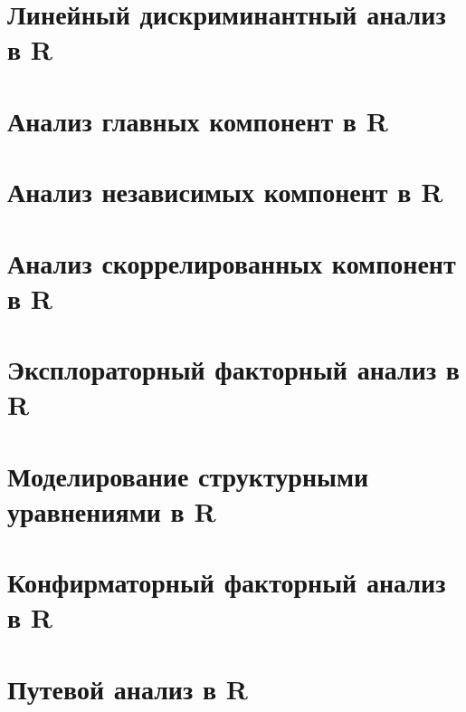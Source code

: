 \documentclass[
  letterpaper,
  DIV=11,
  numbers=noendperiod]{scrreprt}
\theoremstyle{definition}
\theoremstyle{remark}
\begin{document}

\chapter{Линейный дискриминантный анализ в R}\label{randan-lda}


\chapter{Анализ главных компонент в R}\label{randan-pca}


\chapter{Анализ независимых компонент в R}\label{randan-ica}


\chapter{Анализ скоррелированных компонент в R}\label{randan-cca}


\chapter{Эксплораторный факторный анализ в R}\label{randan-efa}


\chapter{Моделирование структурными уравнениями в R}\label{randan-sem}


\chapter{Конфирматорный факторный анализ в R}\label{randan-cfa}


\chapter{Путевой анализ в R}\label{randan-path}
\end{document}
